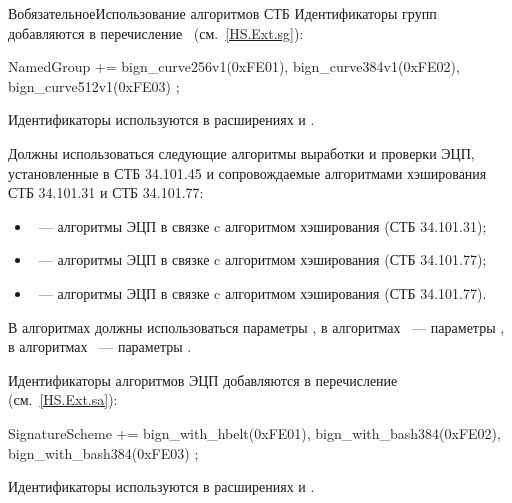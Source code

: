 \begin{appendix}{В}{обязательное}{Использование алгоритмов СТБ}
Идентификаторы групп добавляются в перечисление~
(см.~\ref{HS.Ext.sg}):
\begin{codeblock}
NamedGroup += {
  bign_curve256v1(0xFE01),
  bign_curve384v1(0xFE02),
  bign_curve512v1(0xFE03)
};
\end{codeblock}

Идентификаторы используются в расширениях  
и .

\label{BSUITES.DS}

Должны использоваться следующие алгоритмы выработки и проверки ЭЦП,
установленные в СТБ 34.101.45 и сопровождаемые алгоритмами хэширования 
СТБ 34.101.31 и СТБ 34.101.77:
\begin{itemize}
\item
{}~--- алгоритмы ЭЦП в связке c алгоритмом хэширования 
 (СТБ 34.101.31);
\item
{}~--- алгоритмы ЭЦП в связке c алгоритмом хэширования 
 (СТБ 34.101.77);
\item
{}~--- алгоритмы ЭЦП в связке c алгоритмом хэширования 
 (СТБ 34.101.77).
\end{itemize}

В алгоритмах  должны использоваться параметры
, в алгоритмах ~--- 
параметры , в алгоритмах ~--- 
параметры .

Идентификаторы алгоритмов ЭЦП добавляются в перечисление~
(см.~\ref{HS.Ext.sa}):
\begin{codeblock}
SignatureScheme += {
  bign_with_hbelt(0xFE01),
  bign_with_bash384(0xFE02),
  bign_with_bash384(0xFE03)
};
\end{codeblock}

Идентификаторы используются в расширениях  
и .

\end{appendix}
\mbox{}
\vfill
\mbox{}
\clearpage
